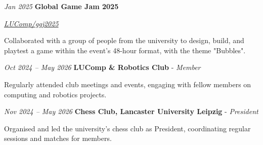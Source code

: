 \documentclass{cv}
\begin{document}
        \vspace{0.13 cm}

        \begin{twocolentry}{
        \textit{Jan 2025}}
            \textbf{Global Game Jam 2025}

            \textit{\href{https://github.com/LUComp/ggj2025}{LUComp/ggj2025}}
        \end{twocolentry}

        \vspace{0.10 cm}
        \begin{onecolentry}
            \begin{highlights}
                \item Collaborated with a group of people from the university to design, build, and playtest a game within the event's 48-hour format, with the theme "Bubbles".
            \end{highlights}
        \end{onecolentry}

        \vspace{0.13 cm}

        \begin{twocolentry}{
        \textit{Oct 2024 – May 2026}}
            \textbf{LUComp \& Robotics Club} - \textit{Member}
        \end{twocolentry}

        \vspace{0.10 cm}
        \begin{onecolentry}
            \begin{highlights}
                \item Regularly attended club meetings and events, engaging with fellow members on computing and robotics projects.
            \end{highlights}
        \end{onecolentry}

        \vspace{0.13 cm}

        \begin{twocolentry}{
        \textit{Nov 2024 – May 2026}}
            \textbf{Chess Club, Lancaster University Leipzig} - \textit{President}
        \end{twocolentry}

        \vspace{0.10 cm}
        \begin{onecolentry}
            \begin{highlights}
                \item Organised and led the university's chess club as President, coordinating regular sessions and matches for members.
            \end{highlights}
        \end{onecolentry}
\end{document}
